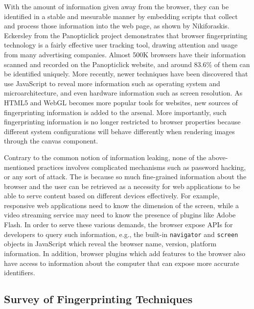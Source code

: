 \documentclass{acm_proc_article-sp}
\begin{document}
With the amount of information given away from the browser, they can be identified in a stable and mesurable manner \cite{niki:cookie} by embedding scripts that collect and process those information into the web page, as shown by Nikiforaskis. 
Eckersley from the Panopticlick project \cite{panop} demonstrates that browser fingerprinting technology is a fairly effective user tracking tool, drawing attention and usage from many advertising companies. Almost 500K browsers have their information scanned and recorded on the Panopticlick website, and around $83.6\%$ of them can be identified uniquely.
More recently, newer techniques have been discovered that use JavaScript to reveal more information such as operating system and microarchitecture, and even hardware information such as screen resolution. \cite{mowery:fg} \cite{boda:user}
As HTML5 and WebGL becomes more popular tools for websites, new sources of fingerprinting information is added to the arsenal. More importantly, such fingerprinting information is no longer restricted to browser properties because different system configurations will behave differently when rendering images through the canvas component.\cite{mowery:pixel}


Contrary to the common notion of information leaking, none of the above-mentioned practices involves complicated mechanisms such as password hacking, or any sort of attack. The is because so much fine-grained information about the browser and the user can be retrieved as a necessity for web applications to be able to serve content based on different devices effectively. For example, responsive web applications need to know the dimension of the screen, while a video streaming service may need to know the presence of plugins like Adobe Flash. 
In order to serve these various demands, the browser expose APIs for developers to query such information, e.g., the built-in \verb|navigator| and \verb|screen| objects in JavaScript which reveal the browser name, version, platform information. 
In addition, browser plugins which add  features to the browser also have access to information about the computer that can expose more accurate identifiers.

\subsection{Survey of Fingerprinting Techniques}
\end{document}
